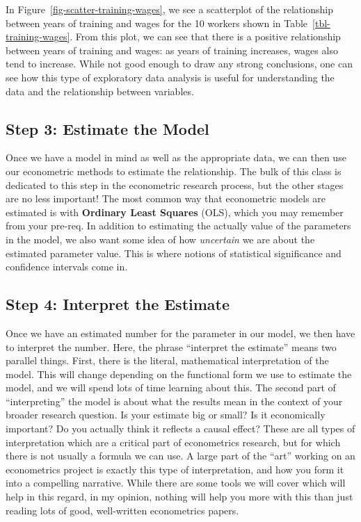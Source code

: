 \documentclass[
  letterpaper,
  DIV=11,
  numbers=noendperiod]{scrreprt}
\begin{document}
In Figure~\ref{fig-scatter-training-wages}, we see a scatterplot of the
relationship between years of training and wages for the 10 workers
shown in Table~\ref{tbl-training-wages}. From this plot, we can see that
there is a positive relationship between years of training and wages: as
years of training increases, wages also tend to increase. While not good
enough to draw any strong conclusions, one can see how this type of
exploratory data analysis is useful for understanding the data and the
relationship between variables.

\subsection{Step 3: Estimate the Model}\label{step-3-estimate-the-model}

Once we have a model in mind as well as the appropriate data, we can
then use our econometric methods to estimate the relationship. The bulk
of this class is dedicated to this step in the econometric research
process, but the other stages are no less important! The most common way
that econometric models are estimated is with \textbf{Ordinary Least
Squares} (OLS), which you may remember from your pre-req. In addition to
estimating the actually value of the parameters in the model, we also
want some idea of how \emph{uncertain} we are about the estimated
parameter value. This is where notions of statistical significance and
confidence intervals come in.

\subsection{Step 4: Interpret the
Estimate}\label{step-4-interpret-the-estimate}

Once we have an estimated number for the parameter in our model, we then
have to interpret the number. Here, the phrase ``interpret the
estimate'' means two parallel things. First, there is the literal,
mathematical interpretation of the model. This will change depending on
the functional form we use to estimate the model, and we will spend lots
of time learning about this. The second part of ``interpreting'' the
model is about what the results mean in the context of your broader
research question. Is your estimate big or small? Is it economically
important? Do you actually think it reflects a causal effect? These are
all types of interpretation which are a critical part of econometrics
research, but for which there is not usually a formula we can use. A
large part of the ``art'' working on an econometrics project is exactly
this type of interpretation, and how you form it into a compelling
narrative. While there are some tools we will cover which will help in
this regard, in my opinion, nothing will help you more with this than
just reading lots of good, well-written econometrics papers.
\end{document}
